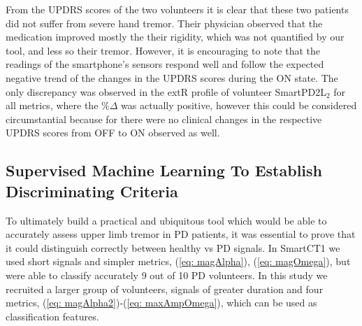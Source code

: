 \noindent
From the \gls{UPDRS} scores of the two volunteers it is clear that these two patients did not suffer from severe hand tremor. Their physician observed that the medication improved mostly the their rigidity, which was not quantified by our tool, and less so their tremor. However, it is encouraging to note that the readings of the smartphone's sensors respond well and follow the expected negative trend of the changes in the \gls{UPDRS} scores during the ON state. The only discrepancy was observed in the extR profile of volunteer \gls{SmartPD2L}$_{2}$ for all metrics, where the $\% \Delta$ was actually positive, however this could be considered circumstantial because for there were no clinical changes in the respective \gls{UPDRS} scores from OFF to ON observed as well. 

\subsection{Supervised Machine Learning To Establish Discriminating Criteria}
\label{subsec:SmartCT2ML}
To ultimately build a practical and ubiquitous tool which would be able to accurately assess upper limb tremor in \gls{PD} patients, it was essential to prove that it could distinguish correctly between healthy vs \gls{PD} signals. In \gls{SmartCT1} we used short signals and simpler metrics, (\ref{eq: magAlpha}), (\ref{eq: magOmega}), but were able to classify accurately 9 out of 10 \gls{PD} volunteers. In this study we recruited a larger group of volunteers, signals of greater duration and four metrics, (\ref{eq: magAlpha2})-(\ref{eq: maxAmpOmega}), which can be used as classification features. 

